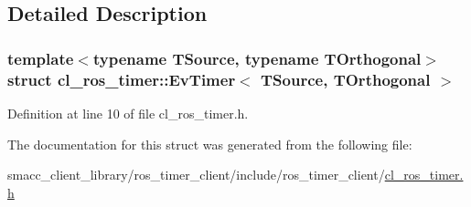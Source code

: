 \subsection{Detailed Description}
\subsubsection*{template$<$typename T\+Source, typename T\+Orthogonal$>$\newline
struct cl\+\_\+ros\+\_\+timer\+::\+Ev\+Timer$<$ T\+Source, T\+Orthogonal $>$}



Definition at line 10 of file cl\+\_\+ros\+\_\+timer.\+h.



The documentation for this struct was generated from the following file\+:\begin{DoxyCompactItemize}
\item 
smacc\+\_\+client\+\_\+library/ros\+\_\+timer\+\_\+client/include/ros\+\_\+timer\+\_\+client/\hyperlink{cl__ros__timer_8h}{cl\+\_\+ros\+\_\+timer.\+h}\end{DoxyCompactItemize}
